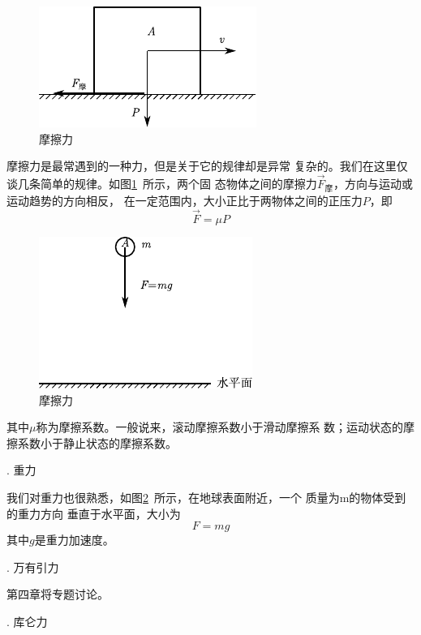 \begin{figure}
    \includegraphics{figure/fig03.04}
    \caption{摩擦力}
    \label{fig:03.04}
\end{figure}
摩擦力是最常遇到的一种力，但是关于它的规律却是异常
复杂的。我们在这里仅谈几条简单的规律。如图\ref{fig:03.04}~所示，两个固
态物体之间的摩擦力$ \vec{F}_\text{摩} $，方向与运动或运动趋势的方向相反，
在一定范围内，大小正比于两物体之间的正压力$ P $，即\vspace{-0.2em}
\begin{equation}\label{eqn:03.04.02}
    \vec{F} = \mu P
\end{equation}

\begin{figure}
    \includegraphics{figure/fig03.05}
    \caption{摩擦力}
    \label{fig:03.05}
\end{figure}
\noindent 其中$\mu$称为摩擦系数。一般说来，滚动摩擦系数小于滑动摩擦系
数；运动状态的摩擦系数小于静止状态的摩擦系数。

. 重力 \normalfont

我们对重力也很熟悉，如图\ref{fig:03.05}~所示，在地球表面附近，一个
质量为m的物体受到的重力方向
垂直于水平面，大小为
\begin{equation}\label{eqn:03.04.03}
    F = m g
\end{equation}
其中$ g $是重力加速度。

. 万有引力 \normalfont

第四章将专题讨论。

. 库仑力 \normalfont

